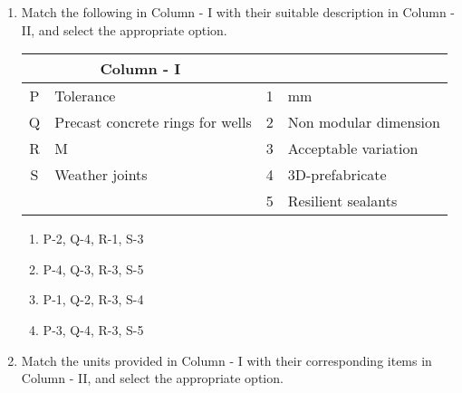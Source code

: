 \documentclass[12pt]{article}
\begin{document}
\begin{enumerate}[label=Q.\arabic*,start=26]
		\begin{multicols}{2}
			\begin{enumerate}
				\item P-1, Q-3, R-2, S-4
				\item P-4, Q-3, R-2, S-5
				\item P-3, Q-4, R-5, S-2
				\item P-4, Q-3, R-1, S-5
			\end{enumerate}
		\end{multicols}

	\item Match the following in Column - I with their suitable description in Column - II, and select the appropriate option.


		\begin{center}
			\begin{tabular}{|c|>{\raggedright\arraybackslash}p{4cm}|c|>{\raggedright\arraybackslash}p{6cm}|}
				\hline
				\multicolumn{2}{|c|}{\textbf{Column - I}} & \multicolumn{2}{c|}{\textbf{Column - II}} \\
				\hline
				P & Tolerance & 1 & 100 mm \\
				\hline
				Q & Precast concrete rings for wells & 2 & Non modular dimension \\
				\hline
				R & M & 3 & Acceptable variation \\
				\hline
				S & Weather joints & 4 & 3D-prefabricate \\
				\hline
				& & 5 & Resilient sealants \\
				\hline
			\end{tabular}
		\end{center}

		\begin{multicols}{2}
			\begin{enumerate}
				\item P-2, Q-4, R-1, S-3
				\item P-4, Q-3, R-3, S-5
				\item P-1, Q-2, R-3, S-4
				\item P-3, Q-4, R-3, S-5
			\end{enumerate}
		\end{multicols}


	\item Match the units provided in Column - I with their corresponding items in Column - II, and select the appropriate option.


\end{enumerate}
\end{document}
